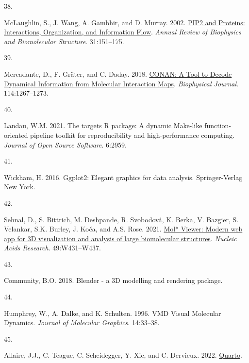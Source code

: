 \documentclass[
  twocolumn]{biophys-new-mod}
\newlength{\cslhangindent}
\newlength{\csllabelwidth}
\newlength{\cslentryspacingunit} %
\newenvironment{CSLReferences}[2] %
 {%
  \setlength{\parindent}{0pt}
  \ifodd #1
  \let\oldpar\par
  \def\par{\hangindent=\cslhangindent\oldpar}
  \fi
  \setlength{\parskip}{#2\cslentryspacingunit}
 }%
 {}
\newcommand{\CSLLeftMargin}[1]{\parbox[t]{\csllabelwidth}{#1}}
\newcommand{\CSLRightInline}[1]{\parbox[t]{\linewidth - \csllabelwidth}{#1}\break}
\begin{document}
\begin{CSLReferences}{0}{0}
\leavevmode{}%
\CSLLeftMargin{38. }%
\CSLRightInline{McLaughlin, S., J. Wang, A. Gambhir, and D. Murray.
2002.
\href{https://doi.org/10.1146/annurev.biophys.31.082901.134259}{{PIP2}
and {Proteins}: {Interactions}, {Organization}, and {Information Flow}}.
\emph{Annual Review of Biophysics and Biomolecular Structure}.
31:151--175.}

\leavevmode{}%
\CSLLeftMargin{39. }%
\CSLRightInline{Mercadante, D., F. Gräter, and C. Daday. 2018.
\href{https://doi.org/10.1016/j.bpj.2018.01.033}{{CONAN}: {A Tool} to
{Decode Dynamical Information} from {Molecular Interaction Maps}}.
\emph{Biophysical Journal}. 114:1267--1273.}

\leavevmode{}%
\CSLLeftMargin{40. }%
\CSLRightInline{Landau, W.M. 2021. The targets {R} package: A dynamic
{Make-like} function-oriented pipeline toolkit for reproducibility and
high-performance computing. \emph{Journal of Open Source Software}.
6:2959.}

\leavevmode{}%
\CSLLeftMargin{41. }%
\CSLRightInline{Wickham, H. 2016. Ggplot2: {Elegant} graphics for data
analysis. {Springer-Verlag New York}.}

\leavevmode{}%
\CSLLeftMargin{42. }%
\CSLRightInline{Sehnal, D., S. Bittrich, M. Deshpande, R. Svobodová, K.
Berka, V. Bazgier, S. Velankar, S.K. Burley, J. Koča, and A.S. Rose.
2021. \href{https://doi.org/10.1093/nar/gkab314}{Mol* {Viewer}: Modern
web app for {3D} visualization and analysis of large biomolecular
structures}. \emph{Nucleic Acids Research}. 49:W431--W437.}

\leavevmode{}%
\CSLLeftMargin{43. }%
\CSLRightInline{Community, B.O. 2018. Blender - a {3D} modelling and
rendering package.}

\leavevmode{}%
\CSLLeftMargin{44. }%
\CSLRightInline{Humphrey, W., A. Dalke, and K. Schulten. 1996. {VMD}
\textendash{} {Visual Molecular Dynamics}. \emph{Journal of Molecular
Graphics}. 14:33--38.}

\leavevmode{}%
\CSLLeftMargin{45. }%
\CSLRightInline{Allaire, J.J., C. Teague, C. Scheidegger, Y. Xie, and C.
Dervieux. 2022. \href{https://doi.org/10.5281/zenodo.5960048}{Quarto}.}


\end{CSLReferences}
\end{document}
